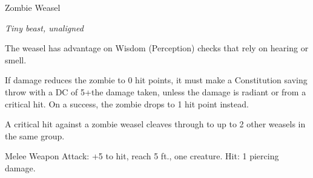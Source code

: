 
\begin{monsterbox}{Zombie Weasel}
\begin{hangingpar}
\textit{Tiny beast, unaligned}
\end{hangingpar}
\dndline%
\basics[%
armorclass = 13,
hitpoints = 1d4 - 1,
speed = {30 ft.}
]
\dndline%
\stats[%
STR = \stat{3},
DEX = \stat{16},
CON = \stat{8},
INT = \stat{2},
WIS = \stat{12},
CHA = \stat{3}
]
\dndline%
\details[%
skills={Stealth +5, Perception +3, },
damageimmunities={},
savingthrows={},
conditionimmunities={},
damageresistances={},
damagevulnerabilities={},
senses={passive Perception 13},
challenge=0
]
\dndline%
\begin{monsteraction}
The weasel has advantage on Wisdom (Perception) checks that rely on hearing or smell.
\end{monsteraction}
\begin{monsteraction}
If damage reduces the zombie to 0 hit points, it must make a Constitution saving throw with a DC of 5+the damage taken, unless the damage is radiant or from a critical hit. On a success, the zombie drops to 1 hit point instead.
\end{monsteraction}
\begin{monsteraction}
A critical hit against a zombie weasel cleaves through to up to 2 other weasels in the same group.
\end{monsteraction}
\begin{monsteraction}[Bite]
Melee Weapon Attack: +5 to hit, reach 5 ft., one creature. Hit: 1 piercing damage.
\end{monsteraction}
\end{monsterbox}
